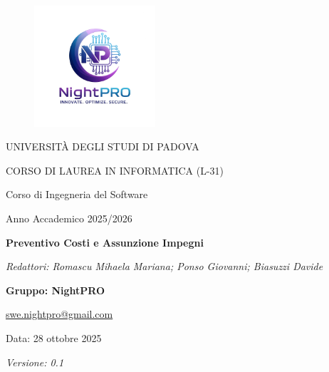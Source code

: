 \documentclass[a4paper, 11pt, oneside]{scrartcl} %
\begin{document}
\thispagestyle{empty}
\begin{titlepage}
    \centering
    
\begin{figure}
    \centering
    \includegraphics[width=0.4\textwidth]{logo.jpg}
\end{figure}

    \vfill
    
    {\small UNIVERSITÀ DEGLI STUDI DI PADOVA \par}
    {\small CORSO DI LAUREA IN INFORMATICA (L-31) \par}
    \vspace{0.5cm}
    {\large Corso di Ingegneria del Software \par}
    {\small Anno Accademico 2025/2026 \par}


    
    \vfill
    
    {\Huge \bfseries Preventivo Costi e Assunzione Impegni \par}
    
    \vspace{1cm}
    
    {\Large \itshape Redattori: Romascu Mihaela Mariana; Ponso Giovanni; Biasuzzi Davide  \par} 
 
    
    \vfill
    
    {\Large \bfseries Gruppo: NightPRO \par}
    \vspace{0.5cm}
    {\large \href{mailto:swe.nightpro@gmail.com}{swe.nightpro@gmail.com} \par}
    
    \vfill
    
    {\large Data: 28 ottobre 2025 \par}
    {\Large \itshape Versione: 0.1 \par} 

\end{titlepage}
\end{document}
